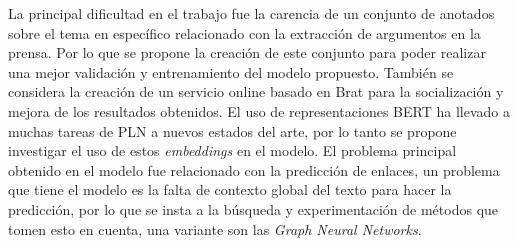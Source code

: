 \begin{recomendations}

    La principal dificultad en el trabajo fue la carencia de un conjunto de anotados
    sobre el tema en específico relacionado con la extracción de argumentos en la prensa.
    Por lo que se propone la creación de este conjunto para poder realizar una mejor 
    validación y entrenamiento del modelo propuesto. También se considera la creación de un servicio 
    online basado en Brat para la socialización y mejora de los resultados obtenidos.
    El uso de representaciones BERT ha llevado a muchas tareas de PLN a nuevos estados 
    del arte, por lo tanto se propone investigar el uso de estos \emph{embeddings} en 
    el modelo. El problema principal obtenido en el modelo fue relacionado con la 
    predicción de enlaces, un problema que tiene el modelo es la falta de contexto global
    del texto para hacer la predicción, por lo que se insta a la búsqueda y experimentación
    de métodos que tomen esto en cuenta, una variante son las \emph{Graph Neural Networks}.

\end{recomendations}
